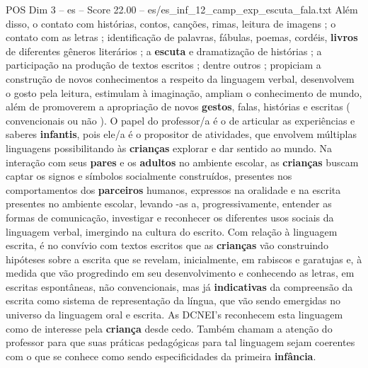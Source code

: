 \begin{textsample}{POS Dim 3 – es – Score 22.00 – es/es\_inf\_12\_camp\_exp\_escuta\_fala.txt}
Além disso, o contato com histórias, contos, canções, rimas, leitura de imagens ; o contato com as letras ; identificação de palavras, fábulas, poemas, cordéis, \textbf{livros} de diferentes gêneros literários ; a \textbf{escuta} e dramatização de histórias ; a participação na produção de textos escritos ; dentre outros ; propiciam a construção de novos conhecimentos a respeito da linguagem verbal, desenvolvem o gosto pela leitura, estimulam à imaginação, ampliam o conhecimento de mundo, além de promoverem a apropriação de novos \textbf{gestos}, falas, histórias e escritas ( convencionais ou não ).
O papel do professor/a é o de articular as experiências e saberes \textbf{infantis}, pois ele/a é o propositor de atividades, que envolvem múltiplas linguagens possibilitando às \textbf{crianças} explorar e dar sentido ao mundo.
Na interação com seus \textbf{pares} e os \textbf{adultos} no ambiente escolar, as \textbf{crianças} buscam captar os signos e símbolos socialmente construídos, presentes nos comportamentos dos \textbf{parceiros} humanos, expressos na oralidade e na escrita presentes no ambiente escolar, levando -as a, progressivamente, entender as formas de comunicação, investigar e reconhecer os diferentes usos sociais da linguagem verbal, imergindo na cultura do escrito.
Com relação à linguagem escrita, é no convívio com textos escritos que as \textbf{crianças} vão construindo hipóteses sobre a escrita que se revelam, inicialmente, em rabiscos e garatujas e, à medida que vão progredindo em seu desenvolvimento e conhecendo as letras, em escritas espontâneas, não convencionais, mas já \textbf{indicativas} da compreensão da escrita como sistema de representação da língua, que vão sendo emergidas no universo da linguagem oral e escrita.
As DCNEI’s reconhecem esta linguagem como de interesse pela \textbf{criança} desde cedo.
Também chamam a atenção do professor para que suas práticas pedagógicas para tal linguagem sejam coerentes com o que se conhece como sendo especificidades da primeira \textbf{infância}.

\end{textsample}
